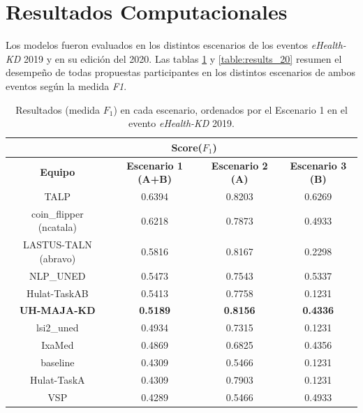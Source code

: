 \section{Resultados Computacionales}

Los modelos fueron evaluados en los distintos escenarios de los eventos \textit{eHealth-KD} 2019 y en su edición del 2020.
Las tablas  \ref{table:results_19} y \ref{table:results_20} resumen el desempeño de todas propuestas participantes en los distintos escenarios de ambos eventos seg\'un la medida \emph{F1}. 

\begin{table}[tb!]\centering
	\caption{Resultados (medida $F_1$) en cada escenario, ordenados por el Escenario 1 en el evento \textit{eHealth-KD} 2019. \label{table:results_19}}
	\begin{tabular}{|c|c|c|c|}
		\hline
		&  \multicolumn{2}{c|}{\textbf{Score($F_1$)}} \\
		\hline
		\textbf{Equipo} & \textbf{Escenario 1 (A+B)} & \textbf{Escenario 2 (A)} & \textbf{Escenario 3 (B)} \\
		\hline
		TALP	          	   &  0.6394 &  0.8203 &  0.6269 \\
		coin\_flipper (ncatala) & 0.6218 &  0.7873 &  0.4933 \\	
		LASTUS-TALN (abravo)   & 0.5816 &  0.8167 &  0.2298	\\
		NLP\_UNED               & 0.5473 &  0.7543 &  0.5337 \\
		Hulat-TaskAB           & 0.5413 &  0.7758 &  0.1231 \\	
		\textbf{UH-MAJA-KD}    & \textbf{0.5189} &  \textbf{0.8156} &  \textbf{0.4336} \\	
		lsi2\_uned              & 0.4934 &  0.7315 &  0.1231	\\
		IxaMed                 & 0.4869 &  0.6825 &  0.4356 \\
		baseline               & 0.4309 &  0.5466 &  0.1231 \\
		Hulat-TaskA            & 0.4309 &  0.7903 &  0.1231 \\	
		VSP             	   & 0.4289 &  0.5466 &  0.4933 \\	
		\hline
	\end{tabular}
\end{table}

